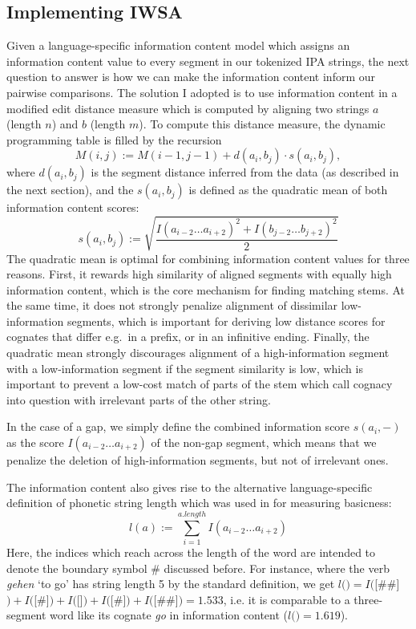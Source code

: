 \subsection{Implementing IWSA}\label{sec:4.3.3}
Given a language-specific information content model which assigns an information content value to every segment in our tokenized IPA strings, the next question to answer is how we can make the information content inform our pairwise comparisons. The solution I adopted is to use information content in a modified edit distance measure which is computed by aligning two strings $a$ (length $n$) and $b$ (length $m$). To compute this distance measure, the dynamic programming table is filled by the recursion
\begin{equation}
 M(i,j) := M(i-1,j-1) + d(a_i,b_j) \cdot s(a_i,b_j),
\end{equation}
where $d(a_i,b_j)$ is the segment distance inferred from the data (as described in the next section), and the  $s(a_i,b_j)$ is defined as the quadratic mean of both information content scores:
\begin{equation}
 s(a_i,b_j) := \sqrt{\frac{I(a_{i-2}\dots a_{i+2})^2 + I(b_{j-2}\dots b_{j+2})^2}{2}}
\end{equation}
The quadratic mean is optimal for combining information content values for three reasons. First, it rewards high similarity of aligned segments with equally high information content, which is the core mechanism for finding matching stems. At the same time, it does not strongly penalize alignment of dissimilar low-information segments, which is important for deriving low distance scores for cognates that differ e.g.\ in a prefix, or in an infinitive ending. Finally, the quadratic mean strongly discourages alignment of a high-information segment with a low-information segment if the segment similarity is low, which is important to prevent a low-cost match of parts of the stem which call cognacy into question with irrelevant parts of the other string.

In the case of a gap, we simply define the combined information score $s(a_i,-)$ as the score $I(a_{i-2}\dots a_{i+2})$ of the non-gap segment, which means that we penalize the deletion of high-information segments, but not of irrelevant ones.

The information content also gives rise to the alternative language-specific definition of phonetic string length which was used in \cite{dellert_buch_2015} for measuring basicness:
\begin{equation}
  l(a) := \sum_{i=1}^{a.length} I(a_{i-2}\dots a_{i+2})
\end{equation}
Here, the indices which reach across the length of the word are intended to denote the boundary symbol $\#$ discussed before. For instance, where the  verb \textit{gehen} \ipa{[gee@n]} `to go' has string length 5 by the standard definition, we get $l($\ipa{[gee@n]}$) = I($[\#\#]$) + I($[\#]$) + I($[]$) + I($[\#]$) + I($[\#\#]$) = 1.533$, i.e. it is comparable to a three-segment word like its  cognate \textit{go} in information content ($l($\ipa{[g@U]}$) = 1.619$).

